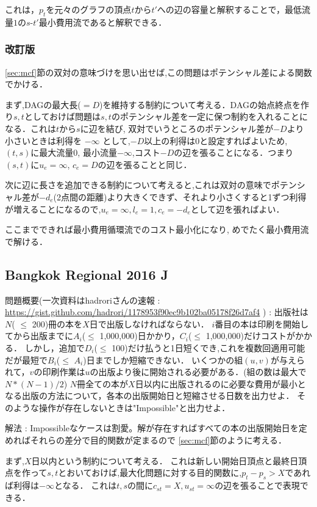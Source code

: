 \documentclass[13pt]{jarticle}
\theoremstyle{nonitalic} %
\begin{document}
これは，$p_t$を元々のグラフの頂点$t$から$t'$への辺の容量と解釈することで，最低流量$1$の$s$-$t'$最小費用流であると解釈できる．

\subsubsection{改訂版}
\ref{sec:mcf}節の双対の意味づけを思い出せば,この問題はポテンシャル差による関数でかける．

まず,DAGの最大長($=D$)を維持する制約について考える．DAGの始点終点を作り$s,t$としておけば問題は$s,t$のポテンシャル差を一定に保つ制約を入れることになる．これは$t$から$s$に辺を結び, 双対でいうところのポテンシャル差が$-D$より小さいときは利得を $-\infty$ として,$-D$以上の利得は0と設定すればよいため,
$(t,s)$に最大流量0, 最小流量$-\infty$,コスト$-D$の辺を張ることになる．つまり$(s,t)$に$u_e = \infty$, $c_e=D$の辺を張ることと同じ．

次に辺に長さを追加できる制約について考えると,これは双対の意味でポテンシャル差が$-d_e$(2点間の距離)より大きくできず、それより小さくすると1ずつ利得が増えることになるので,$u_e = \infty, l_e=1, c_e = -d_e $として辺を張ればよい．

ここまでできれば最小費用循環流でのコスト最小化になり, めでたく最小費用流で解ける．

\subsection{Bangkok Regional 2016 J }
\label{prob:bangkok}
問題概要(一次資料はhadroriさんの速報 : \url{https://gist.github.com/hadrori/1178953f90ec9b102ba05178f26d7af4} ) : 
出版社は$N$( $\leq$ 200)冊の本を$X$日で出版しなければならない．
$i$番目の本は印刷を開始してから出版までに$A_i$($\leq$ 1,000,000)日かかり，$C_i$($\leq$ 1,000,000)だけコストがかかる．
しかし，追加で$D_i$($\leq$ 100)だけ払うと1日短くでき,これを複数回適用可能だが最短で$B_i$($\leq$ $A_i$)日までしか短縮できない．
いくつかの組$(u,v)$が与えられて，$v$の印刷作業は$u$の出版より後に開始される必要がある．(組の数は最大で$N*(N-1)/2$)
$N$冊全ての本が$X$日以内に出版されるのに必要な費用が最小となる出版の方法について，各本の出版開始日と短縮させる日数を出力せよ．
そのような操作が存在しないときは"Impossible"と出力せよ．

解法 : 
Impossibleなケースは割愛。解が存在すればすべての本の出版開始日を定めればそれらの差分で目的関数が定まるので \ref{sec:mcf}節のように考える．

まず,$X$日以内という制約について考える．
これは新しい開始日頂点と最終日頂点を作って$s,t$とおいておけば,最大化問題に対する目的関数に,$p_t - p_s > X $であれば利得は$- \infty$となる．
これは$t,s$の間に$c_{st} = X, u_{st}=\infty$の辺を張ることで表現できる．
\end{document}
